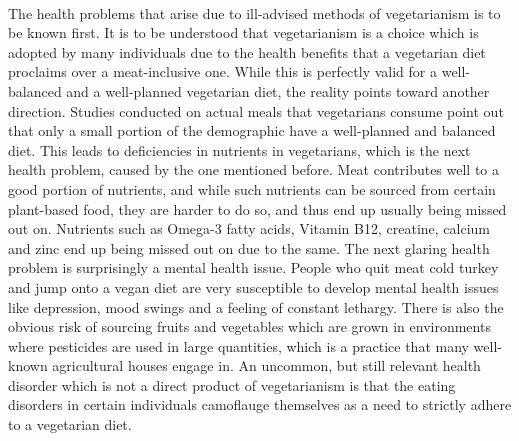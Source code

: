 \documentclass{article}
\begin{document}
\paragraph{} The health problems that arise due to ill-advised methods of vegetarianism is to be known first. It is to be understood that vegetarianism is a choice which is adopted by many individuals due to the health benefits that a vegetarian diet proclaims over a meat-inclusive one. While this is perfectly valid for a well-balanced and a well-planned vegetarian diet, the reality points toward another direction. Studies conducted on actual meals that vegetarians consume point out that only a small portion of the demographic have a well-planned and balanced diet. This leads to deficiencies in nutrients in vegetarians, which is the next health problem, caused by the one mentioned before. Meat contributes well to a good portion of nutrients, and while such nutrients can be sourced from certain plant-based food, they are harder to do so, and thus end up usually being missed out on. Nutrients such as Omega-3 fatty acids, Vitamin B12, creatine, calcium and zinc end up being missed out on due to the same. The next glaring health problem is surprisingly a mental health issue. People who quit meat cold turkey and jump onto a vegan diet are very susceptible to develop mental health issues like depression, mood swings and a feeling of constant lethargy. There is also the obvious risk of sourcing fruits and vegetables which are grown in environments where pesticides are used in large quantities, which is a practice that many well-known agricultural houses engage in. An uncommon, but still relevant health disorder which is not a direct product of vegetarianism is that the eating disorders in certain individuals camoflauge themselves as a need to strictly adhere to a vegetarian diet.
\end{document}
